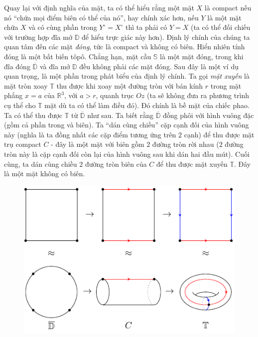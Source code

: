 \begin{multicols}{2}
	\vskip 0.1cm
	Quay lại với định nghĩa của mặt, ta có thể hiểu rằng một mặt $X$ là compact nếu nó ``chứa mọi điểm biên có thể của nó'', hay chính xác hơn, nếu $Y$ là một mặt chứa $X$ và có cùng phần trong $Y^\circ = X^\circ$ thì ta phải có $Y = X$ (ta có thể đối chiếu với trường hợp đĩa mở $\mathbb{D}$ để hiểu trực giác này hơn). Định lý chính của chúng ta quan tâm đến các mặt {\it đóng}, tức là compact và không có biên. Hiển nhiên tính đóng là một bất biến tôpô. Chẳng hạn, mặt cầu $\mathbb{S}$ là một mặt đóng, trong khi đĩa đóng $\overline{\mathbb{D}}$ và đĩa mở $\mathbb{D}$ đều không phải các mặt đóng.
	\vskip 0.1cm
	Sau đây là một ví dụ quan trọng, là một phần trong phát biểu của định lý chính. Ta gọi {\it mặt xuyến} là mặt tròn xoay $\mathbb{T}$ thu được khi xoay một đường tròn với bán kính $r$ trong mặt phẳng $x=a$ của $\mathbb{R}^3$, với $a > r$, quanh trục $Oz$ (ta sẽ không đưa ra phương trình cụ thể cho $\mathbb{T}$ mặt dù ta có thể làm điều đó). Đó chính là bề mặt của chiếc phao. Ta có thể thu được $\mathbb{T}$ từ $\overline{\mathbb{D}}$ như sau. Ta biết rằng $\overline{\mathbb{D}}$ đồng phôi với hình vuông đặc (gồm cả phần trong và biên). Ta ``dán cùng chiều'' cặp cạnh đối của hình vuông này (nghĩa là ta đồng nhất các cặp điểm tương ứng trên $2$ cạnh) để thu được mặt trụ compact $C$ - đây là một mặt với biên gồm $2$ đường tròn rời nhau ($2$ đường tròn này là cặp cạnh đối còn lại của hình vuông sau khi dán hai đầu mút). Cuối cùng, ta dán cùng chiều $2$ đường tròn biên của $C$ để thu được mặt xuyến $\mathbb{T}$. Đây là một mặt không có biên. 
	\begin{figure}[H]
		\vspace*{-5pt}
		\centering\captionsetup{labelformat=empty, justification=centering}
		\includegraphics[width=1\linewidth]{H12.pdf}

\end{figure}
\end{multicols}

